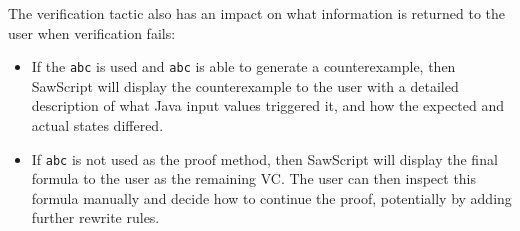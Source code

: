 \documentclass[12pt]{galois-whitepaper}
\newcommand{\sawScript}{{\sc SawScript}\xspace}
\begin{document}
The verification tactic also has an impact on what information is returned
to the user when verification fails:
\begin{itemize}

  \item If the {\tt abc} is used and {\tt abc} is able
          to generate a counterexample, then \sawScript will display the
          counterexample to the user with a detailed description of what Java
          input values triggered it, and how the expected and
          actual states differed.

  \item If {\tt abc} is not used as the proof method, then \sawScript will
         display the final formula to the user as the remaining VC. The user
         can then inspect this formula manually and decide how to continue
         the proof, potentially by adding further rewrite rules.

\end{itemize}
\end{document}
